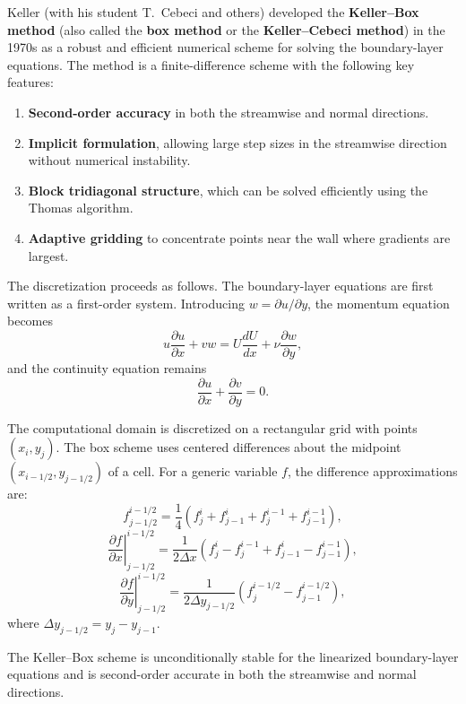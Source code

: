 Keller (with his student T.\ Cebeci and others) developed the \textbf{Keller--Box method} (also called the \textbf{box method} or the \textbf{Keller--Cebeci method}) in the 1970s as a robust and efficient numerical scheme for solving the boundary-layer equations. The method is a finite-difference scheme with the following key features:

\begin{enumerate}
  \item \textbf{Second-order accuracy} in both the streamwise and normal directions.
  \item \textbf{Implicit formulation}, allowing large step sizes in the streamwise direction without numerical instability.
  \item \textbf{Block tridiagonal structure}, which can be solved efficiently using the Thomas algorithm.
  \item \textbf{Adaptive gridding} to concentrate points near the wall where gradients are largest.
\end{enumerate}

The discretization proceeds as follows. The boundary-layer equations are first written as a first-order system. Introducing \(w = \partial u/\partial y\), the momentum equation becomes
\[
u \frac{\partial u}{\partial x} + v w = U\frac{dU}{dx} + \nu \frac{\partial w}{\partial y},
\]
and the continuity equation remains
\[
\frac{\partial u}{\partial x} + \frac{\partial v}{\partial y} = 0.
\]

The computational domain is discretized on a rectangular grid with points \((x_i, y_j)\). The box scheme uses centered differences about the midpoint \((x_{i-1/2}, y_{j-1/2})\) of a cell. For a generic variable \(f\), the difference approximations are:
\[
f_{j-1/2}^{i-1/2} = \frac{1}{4}\left(f_j^i + f_{j-1}^i + f_j^{i-1} + f_{j-1}^{i-1}\right),
\]
\[
\left.\frac{\partial f}{\partial x}\right|_{j-1/2}^{i-1/2} = \frac{1}{2\Delta x}\left(f_j^i - f_j^{i-1} + f_{j-1}^i - f_{j-1}^{i-1}\right),
\]
\[
\left.\frac{\partial f}{\partial y}\right|_{j-1/2}^{i-1/2} = \frac{1}{2\Delta y_{j-1/2}}\left(f_j^{i-1/2} - f_{j-1}^{i-1/2}\right),
\]
where \(\Delta y_{j-1/2} = y_j - y_{j-1}\).

\begin{theorem}
The Keller--Box scheme is unconditionally stable for the linearized boundary-layer equations and is second-order accurate in both the streamwise and normal directions.
\end{theorem}

